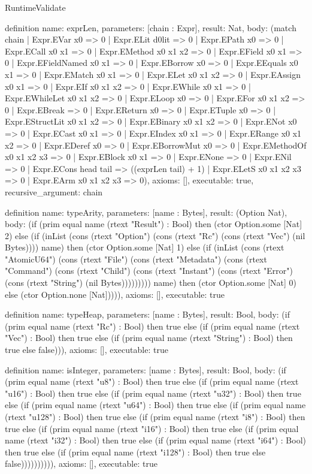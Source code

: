 \begin{lexlean}{RuntimeValidate}
\begin{semanticmodule}
definition{
  name: exprLen,
  parameters: [chain : Expr],
  result: Nat,
  body: (match chain
    | Expr.EVar x0 => 0
    | Expr.ELit d0lit => 0
    | Expr.EPath x0 => 0
    | Expr.ECall x0 x1 => 0
    | Expr.EMethod x0 x1 x2 => 0
    | Expr.EField x0 x1 => 0
    | Expr.EFieldNamed x0 x1 => 0
    | Expr.EBorrow x0 => 0
    | Expr.EEquals x0 x1 => 0
    | Expr.EMatch x0 x1 => 0
    | Expr.ELet x0 x1 x2 => 0
    | Expr.EAssign x0 x1 => 0
    | Expr.EIf x0 x1 x2 => 0
    | Expr.EWhile x0 x1 => 0
    | Expr.EWhileLet x0 x1 x2 => 0
    | Expr.ELoop x0 => 0
    | Expr.EFor x0 x1 x2 => 0
    | Expr.EBreak => 0
    | Expr.EReturn x0 => 0
    | Expr.ETuple x0 => 0
    | Expr.EStructLit x0 x1 x2 => 0
    | Expr.EBinary x0 x1 x2 => 0
    | Expr.ENot x0 => 0
    | Expr.ECast x0 x1 => 0
    | Expr.EIndex x0 x1 => 0
    | Expr.ERange x0 x1 x2 => 0
    | Expr.EDeref x0 => 0
    | Expr.EBorrowMut x0 => 0
    | Expr.EMethodOf x0 x1 x2 x3 => 0
    | Expr.EBlock x0 x1 => 0
    | Expr.ENone => 0
    | Expr.ENil => 0
    | Expr.ECons head tail => ((exprLen tail) + 1)
    | Expr.ELetS x0 x1 x2 x3 => 0
    | Expr.EArm x0 x1 x2 x3 => 0),
  axioms: [],
  executable: true,
  recursive_argument: chain
}

definition{
  name: typeArity,
  parameters: [name : Bytes],
  result: (Option Nat),
  body: (if (prim equal name (rtext "Result") : Bool) then (ctor Option.some [Nat] 2) else (if (inList (cons (rtext "Option") (cons (rtext "Rc") (cons (rtext "Vec") (nil Bytes)))) name) then (ctor Option.some [Nat] 1) else (if (inList (cons (rtext "AtomicU64") (cons (rtext "File") (cons (rtext "Metadata") (cons (rtext "Command") (cons (rtext "Child") (cons (rtext "Instant") (cons (rtext "Error") (cons (rtext "String") (nil Bytes))))))))) name) then (ctor Option.some [Nat] 0) else (ctor Option.none [Nat])))),
  axioms: [],
  executable: true
}

definition{
  name: typeHeap,
  parameters: [name : Bytes],
  result: Bool,
  body: (if (prim equal name (rtext "Rc") : Bool) then true else (if (prim equal name (rtext "Vec") : Bool) then true else (if (prim equal name (rtext "String") : Bool) then true else false))),
  axioms: [],
  executable: true
}

definition{
  name: isInteger,
  parameters: [name : Bytes],
  result: Bool,
  body: (if (prim equal name (rtext "u8") : Bool) then true else (if (prim equal name (rtext "u16") : Bool) then true else (if (prim equal name (rtext "u32") : Bool) then true else (if (prim equal name (rtext "u64") : Bool) then true else (if (prim equal name (rtext "u128") : Bool) then true else (if (prim equal name (rtext "i8") : Bool) then true else (if (prim equal name (rtext "i16") : Bool) then true else (if (prim equal name (rtext "i32") : Bool) then true else (if (prim equal name (rtext "i64") : Bool) then true else (if (prim equal name (rtext "i128") : Bool) then true else false)))))))))),
  axioms: [],
  executable: true
}


\end{semanticmodule}
\end{lexlean}
